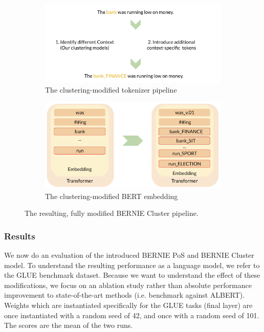 \documentclass[a4paper,12pt,oneside,openright]{report}
\begin{document}
\begin{figure}
\center
\begin{subfigure}{.5\textwidth}
  \centering
  \includegraphics[width=\linewidth]{./assets/experiments/pipeline_tokenizer_BERnie_meaning.png}
  \caption{The clustering-modified tokenizer pipeline}
  \label{fig:sfig1}
\end{subfigure}%
\begin{subfigure}{.55\textwidth}
  \centering
  \includegraphics[width=\linewidth]{./assets/experiments/pipeline_model_BERnie_meaning_embedding.png}
  \caption{The clustering-modified BERT embedding}
  \label{fig:sfig2}
\end{subfigure}
\caption{The resulting, fully modified BERNIE Cluster pipeline.}
\label{fig:fig}
\end{figure}


\subsubsection{Results}

We now do an evaluation of the introduced BERNIE PoS and BERNIE Cluster model.
To understand the resulting performance as a language model, we refer to the GLUE benchmark dataset.
Because we want to understand the effect of these modifications, we focus on an ablation study rather than absolute performance improvement to state-of-the-art methods (i.e. benchmark against ALBERT).
Weights which are instantiated specifically for the GLUE tasks (final layer) are once instantiated with a random seed of 42, and once with a random seed of 101.
The scores are the mean of the two runs.
\end{document}
